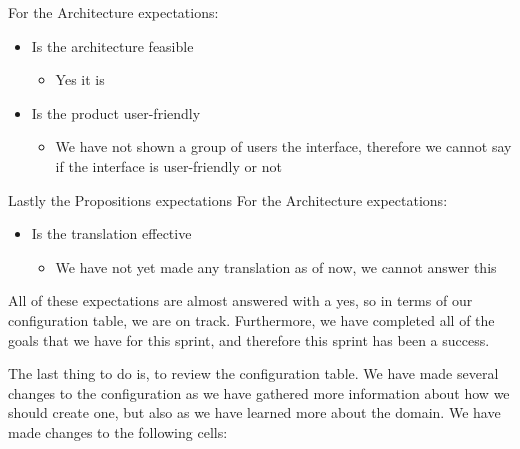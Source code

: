For the Architecture expectations:
\begin{itemize}
    \item Is the architecture feasible
    \begin{itemize}
        \item Yes it is
    \end{itemize}
    \item Is the product user-friendly
    \begin{itemize}
        \item We have not shown a group of users the interface, therefore we cannot say if the interface is user-friendly or not
    \end{itemize}
\end{itemize}

Lastly the Propositions expectations
For the Architecture expectations:
\begin{itemize}
    \item Is the translation effective
    \begin{itemize}
        \item We have not yet made any translation as of now, we cannot answer this
    \end{itemize}
\end{itemize}

All of these expectations are almost answered with a yes, so in terms of our configuration table, we are on track.
Furthermore, we have completed all of the goals that we have for this sprint, and therefore this sprint has been a success.

The last thing to do is, to review the configuration table.
We have made several changes to the configuration as we have gathered more information about how we should create one, but also as we have learned more about the domain.
We have made changes to the following cells:

